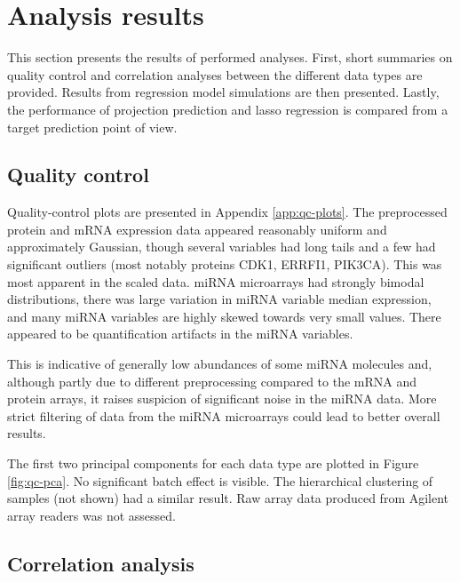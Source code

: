 
\section{Analysis results}

This section presents the results of performed analyses. First, short
summaries on quality control and correlation analyses between the different
data types are provided. Results from regression model simulations are then
presented. Lastly, the performance of projection prediction and lasso regression
is compared from a target prediction point of view.




\subsection*{Quality control}

Quality-control plots are presented in Appendix \ref{app:qc-plots}. 
The preprocessed protein and mRNA expression data appeared reasonably uniform
and approximately Gaussian, though several variables had long tails
and a few had significant outliers (most notably proteins CDK1, ERRFI1, PIK3CA).
This was most apparent in the scaled data. miRNA microarrays had strongly bimodal
distributions, there was large variation in miRNA variable median expression,
and many miRNA variables are highly skewed towards very small values.
There appeared to be quantification artifacts in the miRNA variables.

This is indicative of generally low abundances of some miRNA molecules
and, although partly due to different preprocessing compared to the mRNA and
protein arrays, it raises suspicion of significant noise in the miRNA data.
More strict filtering of data from the miRNA microarrays could lead to better
overall results.

The first two principal components for each data type are
plotted in Figure \ref{fig:qc-pca}. No significant batch effect is visible. The
hierarchical clustering of samples (not shown) had a similar result.
Raw array data produced from Agilent array readers was not assessed.




\subsection*{Correlation analysis}

